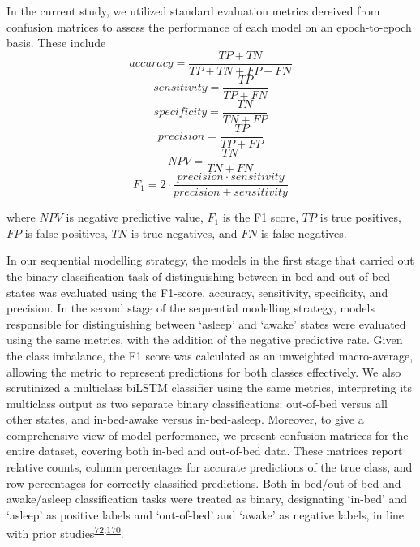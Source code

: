 \documentclass[
  10pt,
]{scrbook}
\begin{document}
In the current study, we utilized standard evaluation metrics dereived
from confusion matrices to assess the performance of each model on an
epoch-to-epoch basis. These include
\[accuracy = \frac{TP+TN}{TP+TN+FP+FN}\]
\[sensitivity = \frac{TP}{TP+FN}\] \[specificity = \frac{TN}{TN+FP}\]
\[precision = \frac{TP}{TP+FP}\] \[NPV = \frac{TN}{TN + FN}\]
\[F_1 = 2 \cdot \frac{precision \cdot sensitivity}{precision + sensitivity}\]

where \(NPV\) is negative predictive value, \(F_1\) is the F1 score,
\(TP\) is true positives, \(FP\) is false positives, \(TN\) is true
negatives, and \(FN\) is false negatives.

In our sequential modelling strategy, the models in the first stage that
carried out the binary classification task of distinguishing between
in-bed and out-of-bed states was evaluated using the F1-score, accuracy,
sensitivity, specificity, and precision. In the second stage of the
sequential modelling strategy, models responsible for distinguishing
between `asleep' and `awake' states were evaluated using the same
metrics, with the addition of the negative predictive rate. Given the
class imbalance, the F1 score was calculated as an unweighted
macro-average, allowing the metric to represent predictions for both
classes effectively. We also scrutinized a multiclass biLSTM classifier
using the same metrics, interpreting its multiclass output as two
separate binary classifications: out-of-bed versus all other states, and
in-bed-awake versus in-bed-asleep. Moreover, to give a comprehensive
view of model performance, we present confusion matrices for the entire
dataset, covering both in-bed and out-of-bed data. These matrices report
relative counts, column percentages for accurate predictions of the true
class, and row percentages for correctly classified predictions. Both
in-bed/out-of-bed and awake/asleep classification tasks were treated as
binary, designating `in-bed' and `asleep' as positive labels and
`out-of-bed' and `awake' as negative labels, in line with prior
studies\textsuperscript{\protect\hyperlink{ref-hjorth_measure_2012}{72},\protect\hyperlink{ref-kushida_comparison_2001}{170}}.
\end{document}
